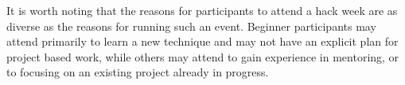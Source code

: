 It is worth noting that the reasons for participants to attend a hack week are as diverse as the reasons for running such an event. 
Beginner participants may attend primarily to learn a new technique and may not have an explicit plan for project based work, while others may attend to gain experience in mentoring, or to focusing on an existing project already in progress.

